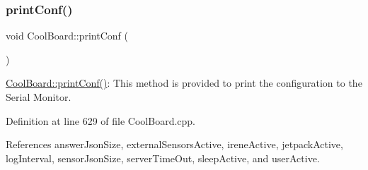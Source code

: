 \subsubsection{\texorpdfstring{print\+Conf()}{printConf()}}
{\footnotesize\ttfamily void Cool\+Board\+::print\+Conf (\begin{DoxyParamCaption}{ }\end{DoxyParamCaption})}

\hyperlink{classCoolBoard_a486507b8f0981d3cc671ed31c2145755}{Cool\+Board\+::print\+Conf()}\+: This method is provided to print the configuration to the Serial Monitor. 

Definition at line 629 of file Cool\+Board.\+cpp.



References answer\+Json\+Size, external\+Sensors\+Active, irene\+Active, jetpack\+Active, log\+Interval, sensor\+Json\+Size, server\+Time\+Out, sleep\+Active, and user\+Active.


